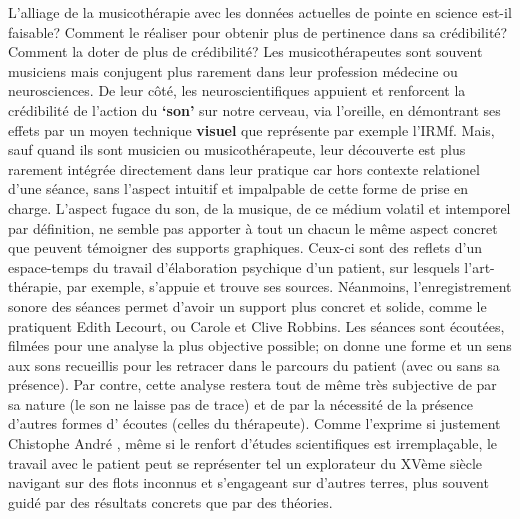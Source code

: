 L'alliage de la musicothérapie avec les données actuelles de pointe en
science est-il faisable? Comment le réaliser pour obtenir plus de pertinence
dans sa crédibilité? Comment la doter de plus de crédibilité?
Les musicothérapeutes sont souvent musiciens mais conjugent plus
rarement dans leur profession
médecine ou neurosciences. De leur côté, les neuroscientifiques appuient
et renforcent la crédibilité de l'action du \textbf{`son'} sur notre cerveau, via
l'oreille, en démontrant ses effets par un moyen technique
\textbf{visuel} que représente par exemple l'IRMf. Mais, sauf quand ils sont musicien ou
musicothérapeute, leur découverte est plus rarement intégrée
directement dans leur pratique car hors contexte relationel d'une
séance, sans l'aspect intuitif et impalpable de cette forme de prise
en charge.
L'aspect fugace du son, de la musique, de ce médium volatil et
intemporel par
définition, ne semble pas apporter à tout un chacun le
même aspect concret que peuvent témoigner des supports
graphiques. Ceux-ci sont des
reflets d'un espace-temps du travail d'élaboration
psychique d'un patient, sur lesquels l'art-thérapie, par exemple, s'appuie et
trouve
ses sources.
Néanmoins, l'enregistrement sonore des séances
permet d'avoir un support plus concret et solide, comme le pratiquent Edith
Lecourt, ou Carole et Clive
Robbins.  \autocite {lecourt_les_2017}
Les séances sont écoutées, filmées pour une
analyse la plus objective possible; on donne
une forme et un sens aux sons recueillis pour les retracer dans le
parcours du patient (avec ou sans sa présence). Par contre, cette analyse  restera
tout de même très subjective de par sa nature (le son ne laisse pas
de trace) et de par la nécessité de la présence d'autres formes d'
écoutes (celles du thérapeute).
Comme l'exprime si justement Chistophe André \autocite[154]{van_eersel_cerveau},
même si le renfort d'études
scientifiques est irremplaçable, le travail avec le patient peut se représenter
tel un
explorateur du XVème siècle navigant sur des flots inconnus et
s'engageant sur d'autres terres, plus souvent guidé par des résultats
concrets que par des théories.
